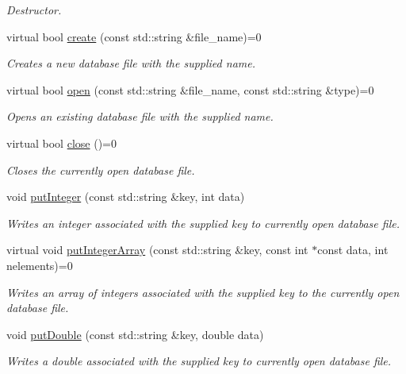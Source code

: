 \begin{DoxyCompactItemize}
\begin{DoxyCompactList}\small\item\em Destructor. \end{DoxyCompactList}\item 
virtual bool \hyperlink{class_c_a_r_o_m_1_1_database_a5399793945da517596be573c47796223}{create} (const std\-::string \&file\-\_\-name)=0
\begin{DoxyCompactList}\small\item\em Creates a new database file with the supplied name. \end{DoxyCompactList}\item 
virtual bool \hyperlink{class_c_a_r_o_m_1_1_database_a420af85386e4d1aa5f20227116f60f83}{open} (const std\-::string \&file\-\_\-name, const std\-::string \&type)=0
\begin{DoxyCompactList}\small\item\em Opens an existing database file with the supplied name. \end{DoxyCompactList}\item 
virtual bool \hyperlink{class_c_a_r_o_m_1_1_database_a75da8db9a3ffa8c4c150f67e62a600e8}{close} ()=0
\begin{DoxyCompactList}\small\item\em Closes the currently open database file. \end{DoxyCompactList}\item 
void \hyperlink{class_c_a_r_o_m_1_1_database_ab765fefcca1980db5d65f40fd618986d}{put\-Integer} (const std\-::string \&key, int data)
\begin{DoxyCompactList}\small\item\em Writes an integer associated with the supplied key to currently open database file. \end{DoxyCompactList}\item 
virtual void \hyperlink{class_c_a_r_o_m_1_1_database_a3de6b822f53f16bd8fe8eaff2ce520c3}{put\-Integer\-Array} (const std\-::string \&key, const int $\ast$const data, int nelements)=0
\begin{DoxyCompactList}\small\item\em Writes an array of integers associated with the supplied key to the currently open database file. \end{DoxyCompactList}\item 
void \hyperlink{class_c_a_r_o_m_1_1_database_aac3a202671f838713e8d4b5dc47b2dca}{put\-Double} (const std\-::string \&key, double data)
\begin{DoxyCompactList}\small\item\em Writes a double associated with the supplied key to currently open database file. \end{DoxyCompactList}\item 

\end{DoxyCompactItemize}

